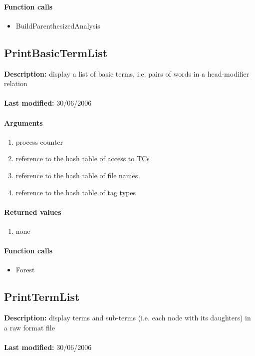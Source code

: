 \paragraph{Function calls}
\begin{itemize}
\item BuildParenthesizedAnalysis
\end{itemize}

\subsection{PrintBasicTermList}
\textbf{Description:} display a list of basic terms, i.e. pairs of words in a head-modifier relation\\
\\\textbf{Last modified:} 30/06/2006

\paragraph{Arguments}
\begin{enumerate}
\item process counter
\item reference to the hash table of access to TCs
\item reference to the hash table of file names
\item reference to the hash table of tag types
\end{enumerate}

\paragraph{Returned values}
\begin{enumerate}
\item none
\end{enumerate}

\paragraph{Function calls}
\begin{itemize}
\item Forest
\end{itemize}

\subsection{PrintTermList}
\textbf{Description:} display terms and sub-terms (i.e. each node with its daughters) in a raw format file\\
\\\textbf{Last modified:} 30/06/2006

